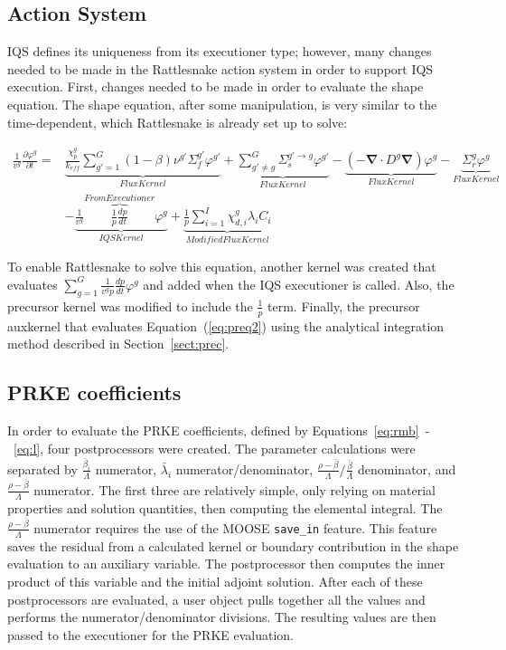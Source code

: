 \documentclass[12pt]{scrartcl}
\renewcommand{\div}{\bs{\nabla}\! \cdot \!}
\newcommand{\grad}{\bs{\nabla}}
\newcommand{\eqt}[1]{Equation~(\ref{#1})}                     %
\newcommand{\sct}[1]{Section~\ref{#1}}                   %
\newcommand{\bs}[1]{\mathbf{#1}}
\newcommand{\keff}{k_\textit{eff}}
\begin{document}
\subsection{Action System}

IQS defines its uniqueness from its executioner type; however, many changes needed to be made in the Rattlesnake action system in order to support IQS execution.   First, changes needed to be made in order to evaluate the shape equation.  The shape equation, after some manipulation, is very similar to the time-dependent, which Rattlesnake is already set up to solve:

\begin{align}
\frac{1}{v^g}\frac{\partial\varphi^g}{\partial t}=&\underbrace{\frac{\chi_p^g}{\keff} \sum_{g'=1}^G (1-\beta) \nu^{g'} \Sigma_f^{g'} \varphi^{g'}}_{Flux Kernel} + \underbrace{\sum_{g'\neq g}^G\Sigma_s^{g'\to g} \varphi^{g'}}_{Flux Kernel} - \underbrace{\left( -\div D^g \grad \right)\varphi^g}_{Flux Kernel} - \underbrace{\Sigma_r^g\varphi^g}_{Flux Kernel} \nonumber \\
& - \underbrace{\frac{1}{v^g} \overbrace{\frac{1}{p}\frac{dp}{dt}}^{From Executioner}\varphi^g}_{IQS Kernel}+\underbrace{\frac{1}{p}\sum_{i=1}^I\chi_{d,i}^g\lambda_iC_i}_{Modified Flux Kernel}
\end{align}

To enable Rattlesnake to solve this equation, another kernel was created that evaluates $\sum_{g=1}^G\frac{1}{v^gp}\frac{dp}{dt}\varphi^g$ and added when the IQS executioner is called.  Also, the precursor kernel was modified to include the $\frac{1}{p}$ term. Finally, the precursor auxkernel that evaluates \eqt{eq:preq2} using the analytical integration method described in \sct{sect:prec}.

\subsection{PRKE coefficients}

In order to evaluate the PRKE coefficients, defined by Equations~\ref{eq:rmb}~-~\ref{eq:l}, four postprocessors were created.  The parameter calculations were separated by $\frac{\bar{\beta}_i}{\Lambda}$ numerator, $\bar{\lambda}_i$ numerator/denominator, $\frac{\rho-\bar{\beta}}{\Lambda}/\frac{\bar{\beta}}{\Lambda}$ denominator, and $\frac{\rho-\bar{\beta}}{\Lambda}$ numerator. The first three are relatively simple, only relying on material properties and solution quantities, then computing the elemental integral.  The $\frac{\rho-\bar{\beta}}{\Lambda}$ numerator requires the use of the MOOSE \texttt{save\_in} feature. This feature saves the residual from a calculated kernel or boundary contribution in the shape evaluation to an auxiliary variable.  The postprocessor then computes the inner product of this variable and the initial adjoint solution.  After each of these postprocessors are evaluated, a user object pulls together all the values and performs the numerator/denominator divisions.  The resulting values are then passed to the executioner for the PRKE evaluation.
\end{document}
